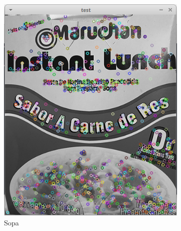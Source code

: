 \begin{figure}[H]
    \centering
    \begin{subfigure}[b]{0.3\textwidth}
        \includegraphics[width=\textwidth]{img/sopa.png}
        \caption{Sopa}
    \end{subfigure}
    ~ %
      \begin{subfigure}[b]{0.2\textwidth}

\end{subfigure}
\end{figure}
